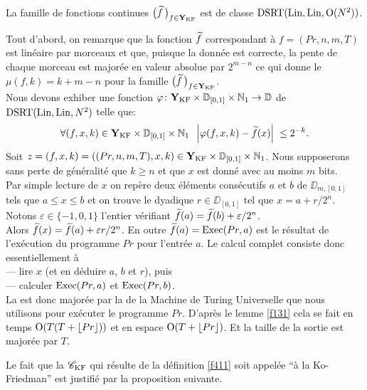 \begin{fproposition} \label{f413}~\\
La famille de fonctions continues  $\big(\widetilde{f}\,\big)_{f \in {{\bf Y}_{\rm KF}}}$  
est \uni de classe  ${\rm DSRT}({\rm Lin}, {\rm Lin}, {\rm O}(N^2))$. 
\end{fproposition}

\proof 
Tout d'abord, on remarque que la fonction  $\widetilde{f}$  correspondant à  
$f = (Pr, n, m, T)$ est linéaire par morceaux et que, puisque la donnée est 
correcte, la pente de chaque morceau est majorée en valeur absolue par  
$2^{m-n}$  ce qui donne le \mcu  $\mu(f,k) = k+m-n$  pour la famille  
$\big(\widetilde{f}\,\big)_{f \in {{\bf Y}_{\rm KF}} }$. \\
Nous devons exhiber une fonction  
$\varphi \colon  {{\bf Y}_{\rm KF}}  \times \mathbb {D}_{[0,1]} \times \mathbb {N}_1 \rightarrow \mathbb {D}$ de \com  
${\rm DSRT}({\rm Lin}, {\rm Lin}, N^2)$  telle que:
\[
\forall (f,x,k) \in {{\bf Y}_{\rm KF}}  \times \mathbb {D}_{[0,1]} \times \mathbb {N}_1 \; \; 
\left|{ \varphi(f,x,k) - \widetilde{f}(x) }\right|\;  \leq 2^{-k}.
\]
Soit  $z=(f,x,k)=((Pr,n,m,T),x,k) \in {{\bf Y}_{\rm KF}}  \times \mathbb {D}_{[0,1]} \times \mathbb {N}_1$.
  Nous supposerons sans perte de généralité que  $k \geq  n$  et que $x$ 
est donné avec au moins $ m $ bits.\\
Par simple lecture de $x$ on repère deux éléments consécutifs  $a$  et  
$b$  de $\DD_{m,[0,1]}$   tels que   $a \leq  x \leq  b$  et on trouve le 
dyadique  $r \in \DD_{[0,1]}$  tel que  $x=a+r/2^n$. \\
Notons  $\varepsilon \in \{-1,0,1\}$   l'entier vérifiant   
$\widetilde{f}(a)=\widetilde{f}(b)+ \varepsilon/2^n$. \\  
Alors   $\widetilde{f}(x) = \widetilde{f}(a) + \varepsilon r/2^n$.  En outre  
$\widetilde{f}(a)= {\rm Exec} (Pr,a)$  est le résultat de l'exécution du 
programme  $Pr$   pour l'entrée  $a$.
Le calcul complet consiste donc essentiellement à \\ 
--- lire $x$  (et en déduire  $a$,  $b$  et  $r$), puis\\
--- calculer  ${\rm Exec} (Pr,a)$  et   ${\rm Exec} (Pr,b)$.\\
La \com est donc majorée par la \com de la Machine de Turing Universelle que nous utilisons pour exécuter le programme  $Pr$. D'après le lemme \ref{f131} cela se fait en temps ${\rm O}(T(T+ \lfloor Pr \rfloor))$ et en espace ${\rm O}(T+ \lfloor Pr \rfloor)$. Et la taille de la sortie est majorée par $T$.
\eop

\medskip Le fait que la \pres  ${{{\mathscr C}}_{\rm KF}}$  qui résulte de la définition \ref{f411} soit 
appelée ``\pres à la Ko-Friedman'' est justifié par la proposition 
suivante.

